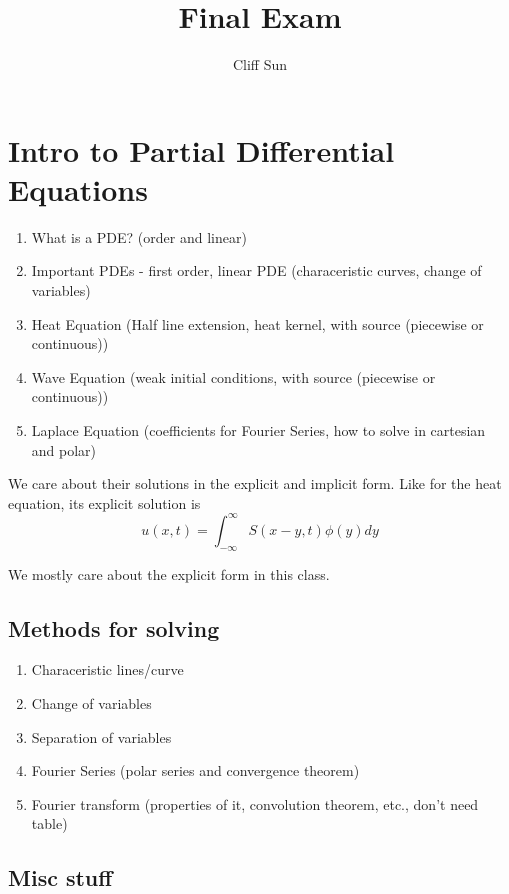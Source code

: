 \documentclass{article}
\title{Final Exam}
\author{Cliff Sun}
\newtheorem{one minute paper}[theorem]{One Minute Paper}
\begin{document}
\maketitle

\section*{Intro to Partial Differential Equations}

\begin{enumerate}
    \item What is a PDE\@? (order and linear)
    \item Important PDEs - first order, linear PDE (characeristic curves, change of variables)
    \item Heat Equation (Half line extension, heat kernel, with source (piecewise or continuous))
    \item Wave Equation (weak initial conditions, with source (piecewise or continuous))
    \item Laplace Equation (coefficients for Fourier Series, how to solve in cartesian and polar)
\end{enumerate}

We care about their solutions in the explicit and implicit form. Like for the heat equation, its explicit solution is 
\begin{equation}
    u(x,t) = \int_{-\infty}^{\infty}S(x-y,t)\phi(y)dy
\end{equation}

We mostly care about the explicit form in this class. 

\subsection*{Methods for solving}

\begin{enumerate}
    \item Characeristic lines/curve
    \item Change of variables
    \item Separation of variables
    \item Fourier Series (polar series and convergence theorem)
    \item Fourier transform (properties of it, convolution theorem, etc., don't need table)
\end{enumerate}

\subsection*{Misc stuff}
\end{document}
